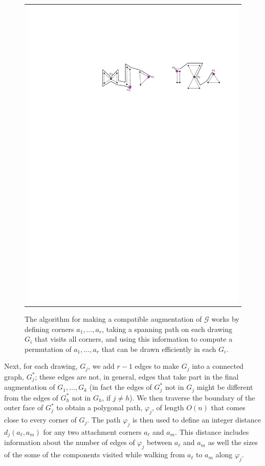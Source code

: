 \documentclass[11pt]{patmorin}
\begin{document}
\begin{figure}
\begin{center}
\begin{tabular}{c}
     \includegraphics{img/example-4} 
   \end{tabular}
  \end{center}
  \caption{The algorithm for making a compatible augmentation of $\mathcal{G}$ works by defining corners $a_1,\ldots,a_r$, taking a spanning path on each drawing $G_i$ that visits all corners, and using this information to compute a permutation of $a_1,\ldots,a_r$ that can be drawn efficiently in each $G_i$.}
  \label{figure:example}
\end{figure}

Next, for each drawing, $G_j$, we add $r-1$ edges to make $G_j$ into a
connected graph, $G_j^*$; these edges are not, in general, edges that
take part in the final augmentation of $G_1,\ldots,G_k$ (in fact the
edges of $G_j^*$ not in $G_j$ might be different from the edges of
$G_h^*$ not in $G_h$, if $j\neq h$).  We then traverse the boundary
of the outer face of $G_j^*$ to obtain a polygonal path, $\varphi_j$,
of length $O(n)$ that comes close to every corner of $G_j$.  The path
$\varphi_j$ is then used to define an integer distance $d_j(a_\ell,a_m)$
for any two attachment corners $a_\ell$ and $a_m$. This distance includes
information about the number of edges of $\varphi_j$ between $a_\ell$
and $a_m$ as well the sizes of the some of the components visited while
walking from $a_\ell$ to $a_m$ along $\varphi_j$.
\end{document}
